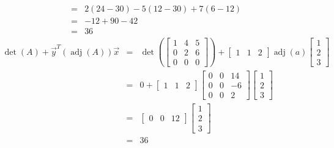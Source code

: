 \documentclass[letterpaper,12pt,fleqn]{article}
\DeclareMathOperator{\adj}{adj}
\newcommand{\vx}{\vec{x}}
\newcommand{\vy}{\vec{y}}
\begin{document}
\begin{example}
\begin{eqnarray*}
    &=& 2(24-30)-5(12-30)+7(6-12) \\
    &=& -12+90-42 \\
    &=& 36
  \end{eqnarray*}
  \begin{eqnarray*}
    \det(A)+\vy^T(\adj(A))\vx &=& \det\left(\begin{bmatrix}
      1 & 4 & 5 \\
      0 & 2 & 6 \\
      0 & 0 & 0
    \end{bmatrix}\right)+\begin{bmatrix} 1 & 1 & 2 \end{bmatrix}\adj(a)
    \begin{bmatrix} 1 \\ 2 \\ 3 \end{bmatrix} \\
    &=& 0 + \begin{bmatrix} 1 & 1 & 2 \end{bmatrix}
    \begin{bmatrix}
      0 & 0 & 14 \\
      0 & 0 & -6 \\
      0 & 0 & 2
    \end{bmatrix}\begin{bmatrix} 1 \\ 2 \\ 3 \end{bmatrix} \\
    &=& \begin{bmatrix} 0 & 0 & 12 \end{bmatrix}
    \begin{bmatrix} 1 \\ 2 \\ 3 \end{bmatrix} \\
    &=& 36
  \end{eqnarray*}
\end{example}
\newpage
\end{document}
